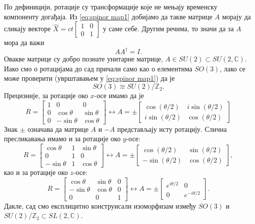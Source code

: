 \documentclass{report}
\theoremstyle{plain}
\theoremstyle{definition}
\begin{document}
По дефиницији, ротације су трансформације које не мењају временску компоненту догађаја. Из \eqref{eq:spinor map1} добијамо да такве матрице $A$ морају да сликају векторе $\hat X = ct\begin{bmatrix} 1 & 0\\ 0 & 1 \end{bmatrix}$ у саме себе. Другим речима, то значи да за $A$ мора да важи $$AA^\dag = I.$$
Овакве матрице су добро познате унитарне матрице, $A\in SU(2)\subset SU(2, \mathbb{C})$. Иако смо о ротацијама до сад причали само као о елементима $SO(3)$, лако се може проверити (уврштавањем у \eqref{eq:spinor map1}) да је
$$SO(3)\cong SU(2)/\mathbb{Z}_2.$$
Прецизније, за ротације око $x$-осе имамо да је
$$R = \begin{bmatrix}
        1 & 0 & 0\\
        0 & \cos\theta & \sin\theta \\
        0 & -\sin\theta & \cos\theta
      \end{bmatrix} \leftrightarrow
  A = \pm \begin{bmatrix}
    \cos(\theta/2) & i\sin(\theta/2) \\
    i\sin(\theta/2) & \cos(\theta/2)
  \end{bmatrix}
$$
Знак $\pm$ означава да матрице $A$ и $-A$ представљају исту ротацију. Слична пресликавања имамо и за ротације око $y$-осе:
$$R = \begin{bmatrix}
        \cos \theta & 1 & \sin\theta\\
        0 & 1 & 0 \\
        -\sin\theta & 1 & \cos\theta
      \end{bmatrix} \leftrightarrow
  A = \pm \begin{bmatrix}
    \cos(\theta/2) & \sin(\theta/2) \\
    -\sin(\theta/2) & \cos(\theta/2)
  \end{bmatrix},
$$
као и за ротације око $z$-осе:
$$R = \begin{bmatrix}
        \cos\theta & \sin\theta & 0 \\
        -\sin\theta & \cos\theta & 0 \\
        0 & 0 & 1
      \end{bmatrix} \leftrightarrow
  A = \pm \begin{bmatrix}
    e^{i\theta/2} & 0 \\
    0 & e^{-i\theta/2}
  \end{bmatrix}.
$$
Дакле, сад смо експлицитно конструисали изоморфизам између $SO(3)$ и $SU(2)/\mathbb{Z}_2 \subset SL(2, \mathbb{C})$.
\end{document}
